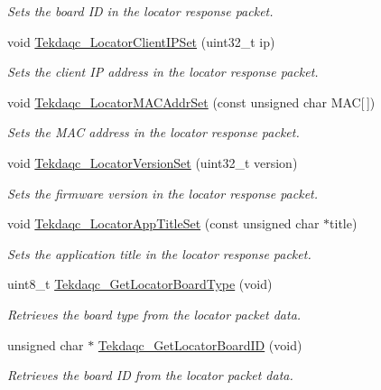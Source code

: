 \begin{DoxyCompactItemize}
\begin{DoxyCompactList}\small\item\em Sets the board I\-D in the locator response packet. \end{DoxyCompactList}\item 
void \hyperlink{group__tekdaqc__locator_ga841da02fec8e79caad0f1d3db9a7af73}{Tekdaqc\-\_\-\-Locator\-Client\-I\-P\-Set} (uint32\-\_\-t ip)
\begin{DoxyCompactList}\small\item\em Sets the client I\-P address in the locator response packet. \end{DoxyCompactList}\item 
void \hyperlink{group__tekdaqc__locator_gaedcc9e5e10826ca40b253bdc274e65cf}{Tekdaqc\-\_\-\-Locator\-M\-A\-C\-Addr\-Set} (const unsigned char M\-A\-C\mbox{[}$\,$\mbox{]})
\begin{DoxyCompactList}\small\item\em Sets the M\-A\-C address in the locator response packet. \end{DoxyCompactList}\item 
void \hyperlink{group__tekdaqc__locator_ga852fe5c43e378a8621913254a3e00bd1}{Tekdaqc\-\_\-\-Locator\-Version\-Set} (uint32\-\_\-t version)
\begin{DoxyCompactList}\small\item\em Sets the firmware version in the locator response packet. \end{DoxyCompactList}\item 
void \hyperlink{group__tekdaqc__locator_gadcd8af9370fe58374d5355c66651b620}{Tekdaqc\-\_\-\-Locator\-App\-Title\-Set} (const unsigned char $\ast$title)
\begin{DoxyCompactList}\small\item\em Sets the application title in the locator response packet. \end{DoxyCompactList}\item 
uint8\-\_\-t \hyperlink{group__tekdaqc__locator_ga573f8960093dc2ab0cc4c88b8f8c6ff9}{Tekdaqc\-\_\-\-Get\-Locator\-Board\-Type} (void)
\begin{DoxyCompactList}\small\item\em Retrieves the board type from the locator packet data. \end{DoxyCompactList}\item 
unsigned char $\ast$ \hyperlink{group__tekdaqc__locator_gae38557024fc843c693d4b6f2cdb5d097}{Tekdaqc\-\_\-\-Get\-Locator\-Board\-I\-D} (void)
\begin{DoxyCompactList}\small\item\em Retrieves the board I\-D from the locator packet data. \end{DoxyCompactList}\item 

\end{DoxyCompactItemize}
